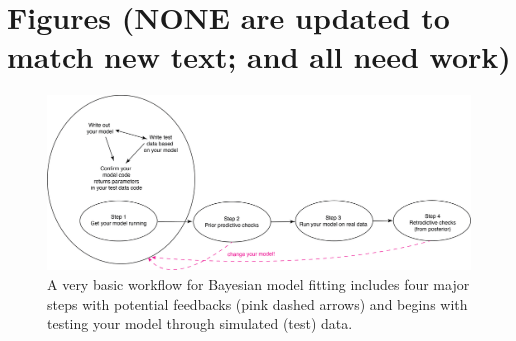 \documentclass[11pt]{article}
\begin{document}
\newpage
\section{Figures (NONE are updated to match new text; and all need work)}

\begin{figure}[ht]
\centering
\noindent \includegraphics[width=1\textwidth]{figures/workflow.png}
\caption{A very basic workflow for Bayesian model fitting includes four major steps with potential feedbacks (pink dashed arrows) and begins with testing your model through simulated (test) data.}
\label{fig:workflow}
\end{figure}
\end{document}
